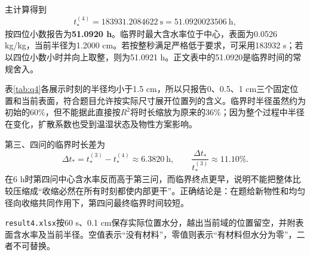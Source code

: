 主计算得到
\begin{equation}
t_*^{(4)}=183931.2084622\ \mathrm s
=51.0920023506\ \mathrm h ,
\end{equation}
按四位小数报告为\textbf{51.0920 h}。临界时最大含水率位于中心，表面为0.0526 kg/kg，当前半径为1.2000 cm。若按整秒满足严格低于要求，可采用183932 s；若以四位小数小时并向上取整，则为51.0921 h。正文表中的51.0920是临界时间的常规舍入。

表\ref{tab:q4}各展示时刻的半径均小于1.5 cm，所以只报告0、0.5、1 cm三个固定位置和当前表面，符合题目允许按实际尺寸展开位置列的含义。临界时半径虽然约为初始的60\%，但不能据此直接按$R^2$将时长缩放为原来的36\%；因为整个过程中半径在变化，扩散系数也受到温湿状态及物性方案影响。

第三、四问的临界时长差为
\begin{equation}
\Delta t_*=t_*^{(3)}-t_*^{(4)}
\approx6.3820\ \mathrm h,\qquad
\frac{\Delta t_*}{t_*^{(3)}}\approx11.10\%.
\end{equation}
在6 h时第四问中心含水率反而高于第三问，而临界终点更早，说明不能把整体比较压缩成“收缩必然在所有时刻都使内部更干”。正确结论是：在题给新物性和均匀径向收缩共同作用下，第四问最终临界时间较短。

\texttt{result4.xlsx}按60 s、0.1 cm保存实际位置水分，越出当前域的位置留空，并附表面含水率及当前半径。空值表示“没有材料”，零值则表示“有材料但水分为零”，二者不可替换。
